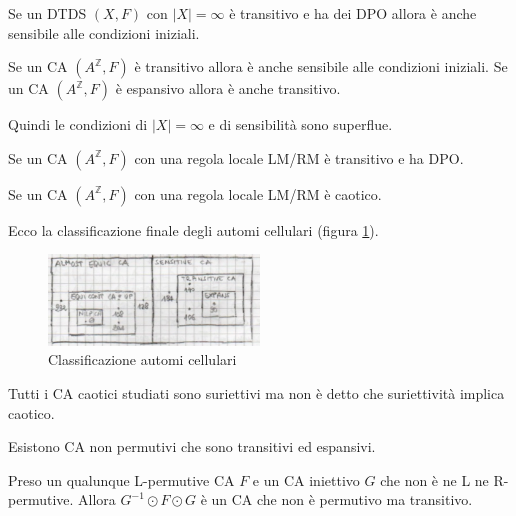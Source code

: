 \begin{teorema}
    Se un DTDS $(X,F)$ con $|X|=\infty$ è transitivo e ha dei DPO allora è anche 
    sensibile alle condizioni iniziali. 
\end{teorema}

\begin{teorema} 
    Se un CA $(A^\mathbb{Z},F)$ è transitivo allora è anche sensibile alle condizioni iniziali.
    Se un CA $(A^\mathbb{Z},F)$ è espansivo allora è anche transitivo.
\end{teorema}

Quindi le condizioni di $|X|=\infty$ e di sensibilità sono superflue.

\begin{teorema}
    Se un CA $(A^\mathbb{Z},F)$ con una regola locale LM/RM è transitivo e ha DPO.
\end{teorema}
\begin{teorema}
    Se un CA $(A^\mathbb{Z},F)$ con una regola locale LM/RM è caotico.
\end{teorema}

Ecco la classificazione finale degli automi cellulari (figura \ref{fig:classificazione_ca}).

\begin{figure}[!hb]
    \centering
    \includegraphics[width=0.5\textwidth]{img/sistemi_complessi/classificazione_ca.png}
    \caption{Classificazione automi cellulari}
    \label{fig:classificazione_ca}
\end{figure}

\begin{nota}
    Tutti i CA caotici studiati sono suriettivi ma non è detto che suriettività 
    implica caotico.
\end{nota}

\begin{nota}
    Esistono CA non permutivi che sono transitivi ed espansivi.

    Preso un qualunque L-permutive CA $F$ e un CA iniettivo $G$ che non è ne L ne R-permutive.
    Allora $G^{-1}\odot F\odot G$ è un CA che non è permutivo ma transitivo.
\end{nota}

